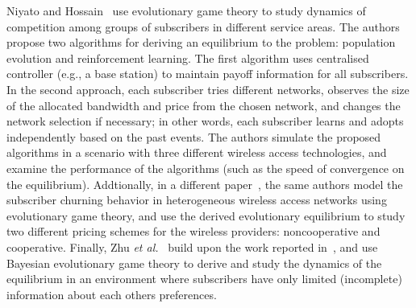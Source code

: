 Niyato and Hossain~\cite{Niyato09} use evolutionary game theory to study dynamics of competition among groups of subscribers in different service areas. The authors propose two algorithms for deriving an equilibrium to the problem: population evolution and reinforcement learning. The first algorithm uses centralised controller (e.g., a base station) to maintain payoff information for all subscribers. In the second approach, each subscriber tries different networks, observes the size of the allocated bandwidth and price from the chosen network, and changes the network selection if necessary; in other words, each subscriber learns and adopts independently based on the past events. The authors simulate the proposed algorithms in a scenario with three different wireless access technologies, and examine the performance of the algorithms (such as the speed of convergence on the equilibrium). Addtionally, in a different paper~\cite{NiyatoHossainConf2008}, the same authors model the subscriber churning behavior in heterogeneous wireless access networks using evolutionary game theory, and use the derived evolutionary equilibrium to study two different pricing schemes for the wireless providers: noncooperative and cooperative. Finally, Zhu \emph{et al.}~\cite{ZhuNiyato2010} build upon the work reported in~\cite{Niyato09}, and use Bayesian evolutionary game theory to derive and study the dynamics of the equilibrium in an environment where subscribers have only limited (incomplete) information about each others preferences.


